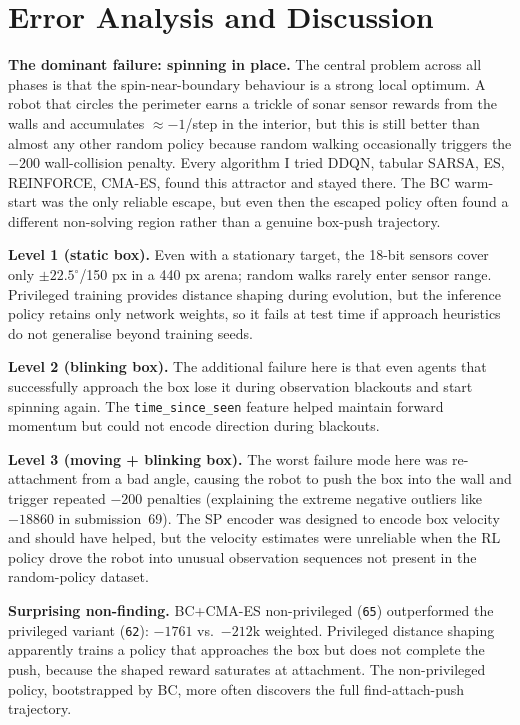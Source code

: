 \documentclass[11pt, oneside]{article}
\begin{document}
\section{Error Analysis and Discussion}

\textbf{The dominant failure: spinning in place.} The central problem across all phases is that the spin-near-boundary behaviour is a strong local optimum. A robot that circles the perimeter earns a trickle of sonar sensor rewards from the walls and accumulates $\approx -1$/step in the interior, but this is still better than almost any other random policy because random walking occasionally triggers the $-200$ wall-collision penalty. Every algorithm I tried DDQN, tabular SARSA, ES, REINFORCE, CMA-ES, found this attractor and stayed there. The BC warm-start was the only reliable escape, but even then the escaped policy often found a different non-solving region rather than a genuine box-push trajectory.

\textbf{Level 1 (static box).} Even with a stationary target, the 18-bit sensors cover only $\pm22.5^{\circ}$/150 px in a 440 px arena; random walks rarely enter sensor range. Privileged training provides distance shaping during evolution, but the inference policy retains only network weights, so it fails at test time if approach heuristics do not generalise beyond training seeds.

\textbf{Level 2 (blinking box).} The additional failure here is that even agents that successfully approach the box lose it during observation blackouts and start spinning again. The \texttt{time\_since\_seen} feature helped maintain forward momentum but could not encode direction during blackouts.

\textbf{Level 3 (moving + blinking box).} The worst failure mode here was re-attachment from a bad angle, causing the robot to push the box into the wall and trigger repeated $-200$ penalties (explaining the extreme negative outliers like $-18860$ in submission~69). The SP encoder was designed to encode box velocity and should have helped, but the velocity estimates were unreliable when the RL policy drove the robot into unusual observation sequences not present in the random-policy dataset.

\textbf{Surprising non-finding.} BC+CMA-ES non-privileged (\texttt{65}) outperformed the privileged variant (\texttt{62}): $-1761$ vs.\ $-212\text{k}$ weighted. Privileged distance shaping apparently trains a policy that approaches the box but does not complete the push, because the shaped reward saturates at attachment. The non-privileged policy, bootstrapped by BC, more often discovers the full find-attach-push trajectory.
\end{document}
